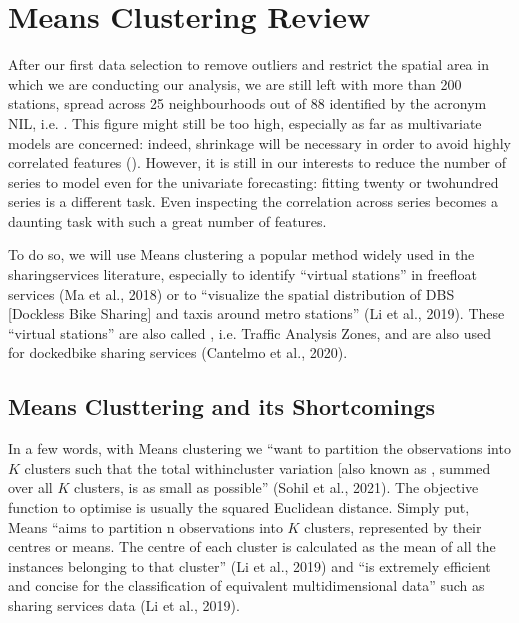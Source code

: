\documentclass[letterpaper,10pt,english]{jupyterBook}
\begin{document}
\section{\sphinxhyphen{}Means Clustering Review}
\label{\detokenize{04-stations_kmeans:k-means-clustering-review}}
\sphinxAtStartPar
After our first data selection to remove outliers and restrict the spatial area in which we are conducting our analysis,
we are still left with more than 200 stations, spread across 25 neighbourhoods out of 88 \sphinxhyphen{} identified by the acronym NIL, i.e. . This figure might still be too high, especially as far as multivariate models are concerned: indeed, shrinkage will be necessary in order to avoid highly correlated features ().
However, it is still in our interests to reduce the number of series to model even for the univariate forecasting: fitting twenty or two\sphinxhyphen{}hundred series is a different task. Even inspecting the correlation across series becomes a daunting task with such a great number of features.

\sphinxAtStartPar
To do so, we will use \sphinxhyphen{}Means clustering \sphinxhyphen{} a popular method widely used in the sharing\sphinxhyphen{}services literature, especially to identify “virtual stations” in free\sphinxhyphen{}float services (Ma et al., 2018) or to “visualize the spatial distribution of DBS {[}Dockless Bike Sharing{]} and taxis around metro stations” (Li et al., 2019). These “virtual stations” are also called , i.e. Traffic Analysis Zones, and are also used for docked\sphinxhyphen{}bike sharing services (Cantelmo et al., 2020).


\subsection{\sphinxhyphen{}Means Clusttering and its Shortcomings}
\label{\detokenize{04-stations_kmeans:k-means-clusttering-and-its-shortcomings}}
\sphinxAtStartPar
In a few words, with \sphinxhyphen{}Means clustering  we “want to partition the observations into \(K\) clusters such that the total within\sphinxhyphen{}cluster variation {[}also known as  \sphinxstyleemphasis{inertia}{]}, summed over all \(K\) clusters, is as small as possible” (Sohil et al., 2021). The objective function to optimise is usually the squared Euclidean distance. Simply put, \sphinxhyphen{}Means “aims to partition n observations into \(K\) clusters, represented by their centres or means. The centre of each cluster is calculated as the mean of all the instances belonging to that cluster” (Li et al., 2019) and “is extremely efficient and concise for the classification of equivalent multidimensional data” such as sharing services data (Li et al., 2019).
\end{document}
